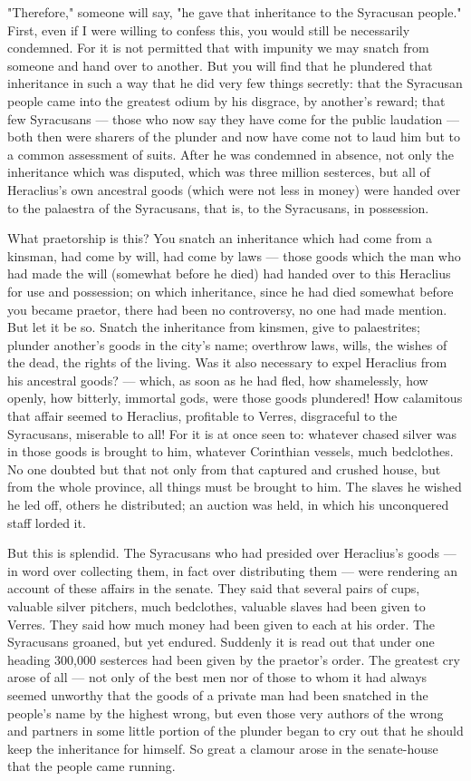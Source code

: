  "Therefore," someone will say, "he gave that inheritance to the Syracusan people." First, even if I were willing to confess this, you would still be necessarily condemned. For it is not permitted that with impunity we may snatch from someone and hand over to another. But you will find that he plundered that inheritance in such a way that he did very few things secretly: that the Syracusan people came into the greatest odium by his disgrace, by another's reward; that few Syracusans --- those who now say they have come for the public laudation --- both then were sharers of the plunder and now have come not to laud him but to a common assessment of suits. After he was condemned in absence, not only the inheritance which was disputed, which was three million sesterces, but all of Heraclius's own ancestral goods (which were not less in money) were handed over to the palaestra of the Syracusans, that is, to the Syracusans, in possession.

 What praetorship is this? You snatch an inheritance which had come from a kinsman, had come by will, had come by laws --- those goods which the man who had made the will (somewhat before he died) had handed over to this Heraclius for use and possession; on which inheritance, since he had died somewhat before you became praetor, there had been no controversy, no one had made mention. But let it be so. Snatch the inheritance from kinsmen, give to palaestrites; plunder another's goods in the city's name; overthrow laws, wills, the wishes of the dead, the rights of the living. Was it also necessary to expel Heraclius from his ancestral goods? --- which, as soon as he had fled, how shamelessly, how openly, how bitterly, immortal gods, were those goods plundered! How calamitous that affair seemed to Heraclius, profitable to Verres, disgraceful to the Syracusans, miserable to all! For it is at once seen to: whatever chased silver was in those goods is brought to him, whatever Corinthian vessels, much bedclothes. No one doubted but that not only from that captured and crushed house, but from the whole province, all things must be brought to him. The slaves he wished he led off, others he distributed; an auction was held, in which his unconquered staff lorded it.

 But this is splendid. The Syracusans who had presided over Heraclius's goods --- in word over collecting them, in fact over distributing them --- were rendering an account of these affairs in the senate. They said that several pairs of cups, valuable silver pitchers, much bedclothes, valuable slaves had been given to Verres. They said how much money had been given to each at his order. The Syracusans groaned, but yet endured. Suddenly it is read out that under one heading 300,000 sesterces had been given by the praetor's order. The greatest cry arose of all --- not only of the best men nor of those to whom it had always seemed unworthy that the goods of a private man had been snatched in the people's name by the highest wrong, but even those very authors of the wrong and partners in some little portion of the plunder began to cry out that he should keep the inheritance for himself. So great a clamour arose in the senate-house that the people came running.


